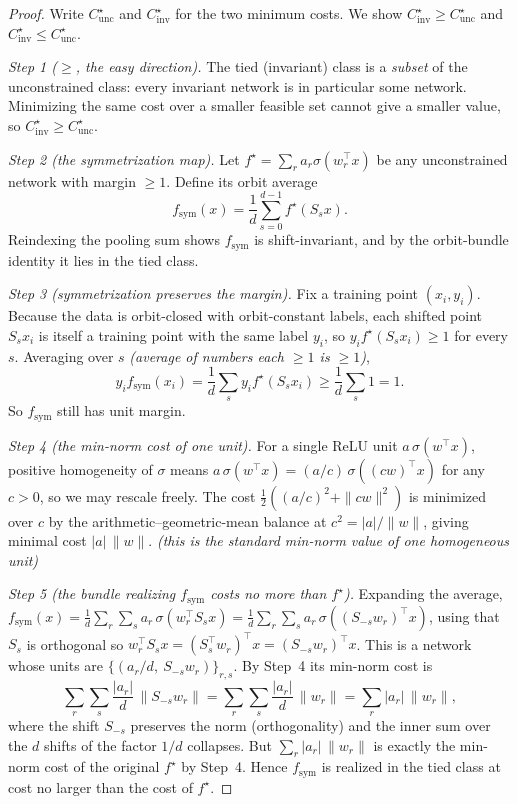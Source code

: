 \begin{proof}
Write $C^\star_{\mathrm{unc}}$ and $C^\star_{\mathrm{inv}}$ for the two minimum costs. We show
$C^\star_{\mathrm{inv}} \ge C^\star_{\mathrm{unc}}$ and $C^\star_{\mathrm{inv}} \le
C^\star_{\mathrm{unc}}$.

\emph{Step 1 ($\ge$, the easy direction).}
The tied (invariant) class is a \emph{subset} of the unconstrained class: every invariant network is
in particular some network. Minimizing the same cost over a smaller feasible set cannot give a smaller
value, so $C^\star_{\mathrm{inv}} \ge C^\star_{\mathrm{unc}}$.

\emph{Step 2 (the symmetrization map).}
Let $f^\star = \sum_r a_r\sigma(w_r^\top x)$ be any unconstrained network with margin $\ge 1$. Define
its orbit average
\[
f_{\mathrm{sym}}(x) = \frac1d\sum_{s=0}^{d-1} f^\star(S_s x).
\]
Reindexing the pooling sum shows $f_{\mathrm{sym}}$ is shift-invariant, and by the orbit-bundle
identity it lies in the tied class.

\emph{Step 3 (symmetrization preserves the margin).}
Fix a training point $(x_i, y_i)$. Because the data is orbit-closed with orbit-constant labels, each
shifted point $S_s x_i$ is itself a training point with the same label $y_i$, so $y_i f^\star(S_s x_i)
\ge 1$ for every $s$. Averaging over $s$ \emph{(average of numbers each $\ge 1$ is $\ge 1$)},
\[
y_i f_{\mathrm{sym}}(x_i) = \frac1d\sum_s y_i f^\star(S_s x_i) \ge \frac1d\sum_s 1 = 1 .
\]
So $f_{\mathrm{sym}}$ still has unit margin.

\emph{Step 4 (the min-norm cost of one unit).}
For a single ReLU unit $a\,\sigma(w^\top x)$, positive homogeneity of $\sigma$ means
$a\,\sigma(w^\top x) = (a/c)\,\sigma((cw)^\top x)$ for any $c>0$, so we may rescale freely. The cost
$\tfrac12((a/c)^2 + \|cw\|^2)$ is minimized over $c$ by the arithmetic--geometric-mean balance at
$c^2 = |a|/\|w\|$, giving minimal cost $|a|\,\|w\|$. \emph{(this is the standard min-norm value of one
homogeneous unit)}

\emph{Step 5 (the bundle realizing $f_{\mathrm{sym}}$ costs no more than $f^\star$).}
Expanding the average, $f_{\mathrm{sym}}(x) = \frac1d\sum_r\sum_s a_r\,\sigma(w_r^\top S_s x)
= \frac1d\sum_r\sum_s a_r\,\sigma((S_{-s}w_r)^\top x)$, using that $S_s$ is orthogonal so
$w_r^\top S_s x = (S_s^\top w_r)^\top x = (S_{-s}w_r)^\top x$. This is a network whose units are
$\{(a_r/d,\ S_{-s}w_r)\}_{r,s}$. By Step~4 its min-norm cost is
\[
\sum_r\sum_s \frac{|a_r|}{d}\,\|S_{-s}w_r\|
= \sum_r\sum_s \frac{|a_r|}{d}\,\|w_r\|
= \sum_r |a_r|\,\|w_r\| ,
\]
where the shift $S_{-s}$ preserves the norm (orthogonality) and the inner sum over the $d$ shifts of
the factor $1/d$ collapses. But $\sum_r |a_r|\,\|w_r\|$ is exactly the min-norm cost of the original
$f^\star$ by Step~4. Hence $f_{\mathrm{sym}}$ is realized in the tied class at cost no larger than the
cost of $f^\star$.


\end{proof}
